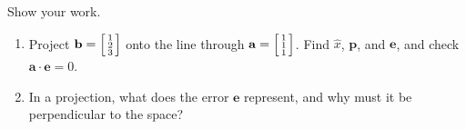 \documentclass[10pt]{article}
\newcommand{\bb}{\mathbf{b}}
\newcommand{\pp}{\mathbf{p}}
\newcommand{\ee}{\mathbf{e}}
\newcommand{\avec}{\mathbf{a}}
\begin{document}
\begin{practicebox}
Show your work.
\begin{enumerate}[leftmargin=1.6em, itemsep=6pt]
  \item Project $\bb=\begin{bsmallmatrix} 1\\2\\3 \end{bsmallmatrix}$ onto the line through
        $\avec=\begin{bsmallmatrix} 1\\1\\1 \end{bsmallmatrix}$. Find $\hat{x}$, $\pp$, and $\ee$, and
        check $\avec\cdot\ee=0$. \writeline
  \item In a projection, what does the error $\ee$ represent, and why must it be perpendicular to the
        space? \writeline
\end{enumerate}
\end{practicebox}
\end{document}
